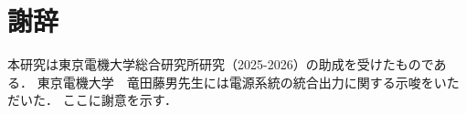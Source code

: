 \documentclass[twoside]{wiss}
\begin{document}
\section*{謝辞}
本研究は東京電機大学総合研究所研究（2025-2026）の助成を受けたものである．
東京電機大学　竜田藤男先生には電源系統の統合出力に関する示唆をいただいた．
ここに謝意を示す．












\balance %




\end{document}
